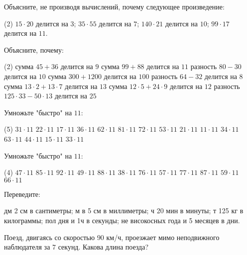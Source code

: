 \begin{class}[number=7]
	\begin{listofex}
	\item Объясните, не производя вычислений, почему следующее произведение:
	\begin{tasks}(2)
		\task \( 15\cdot20 \) делится на \( 3 \);
		\task \( 35\cdot55 \) делится на \( 7 \);
		\task \( 140\cdot21 \) делится на \( 10 \);
		\task \( 99\cdot17 \) делится на \( 11 \).
	\end{tasks}
	\item Объясните, почему:
	\begin{tasks}(2)
		\task сумма \( 45+36 \) делится на \( 9 \)
		\task сумма \( 99+88 \) делится на \( 11 \)
		\task разность \( 80-30 \) делится на \( 10 \)
		\task сумма \( 300+1200 \) делится на \( 100 \)
		\task разность \( 64-32 \) делится на \( 8 \)
		\task сумма \( 13\cdot2+13\cdot7\) делится на \( 13 \)
		\task сумма \( 12\cdot5+24\cdot9\) делится на \( 12 \)
		\task разность \( 125\cdot33-50\cdot13\) делится на \( 25 \)
	\end{tasks}
	\item Умножьте "быстро"{ }на \( 11 \):
	\begin{tasks}(5)
		\task \( 31\cdot11 \)
		\task \( 22\cdot11 \)
		\task \( 17\cdot11 \)
		\task \( 36\cdot11 \)
		\task \( 62\cdot11 \)
		\task \( 81\cdot11 \)
		\task \( 72\cdot11 \)
		\task \( 53\cdot11 \)
		\task \( 21\cdot11 \)
		\task \( 11\cdot11 \)
		\task \( 34\cdot11 \)
		\task \( 63\cdot11 \)
		\task \( 44\cdot11 \)
		\task \( 15\cdot11 \)
		\task \( 33\cdot11 \)
	\end{tasks}
	\item Умножьте "быстро"{ }на \( 11 \):
	\begin{tasks}(4)
		\task \( 47\cdot11 \)
		\task \( 85\cdot11 \)
		\task \( 92\cdot11 \)
		\task \( 49\cdot11 \)
		\task \( 88\cdot11 \)
		\task \( 38\cdot11 \)
		\task \( 76\cdot11 \)
		\task \( 57\cdot11 \)
		\task \( 77\cdot11 \)
		\task \( 87\cdot11 \)
		\task \( 59\cdot11 \)
		\task \( 66\cdot11 \)
	\end{tasks}
	\item Переведите:
	\begin{tasks}
		 дм 2 см в сантиметры;
		 м в 5 см в миллиметры;
		 ч 20 мин в минуты;
		 т 125 кг в килограммы;
		\task пол дня и 1ч в секунды;
		 не високосных года и 5 месяцев в дни.
	\end{tasks}
	\item Поезд, двигаясь со скоростью \( 90 \) км/ч, проезжает мимо неподвижного наблюдателя за \( 7 \) секунд. Какова длина поезда?
	\end{listofex}
\end{class}

